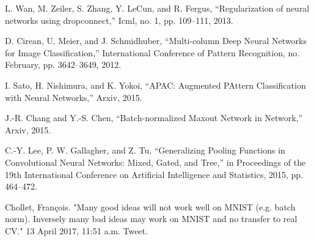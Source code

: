 \documentclass[twoside,twocolumn]{article}
\begin{document}
\begin{thebibliography}{99} %

L. Wan, M. Zeiler, S. Zhang, Y. LeCun, and R. Fergus, “Regularization of neural networks using dropconnect,” Icml, no. 1, pp. 109–111, 2013.

D. Cirean, U. Meier, and J. Schmidhuber, “Multi-column Deep Neural Networks for Image Classification,” International Conference of Pattern Recognition, no. February, pp. 3642–3649, 2012. 

I. Sato, H. Nishimura, and K. Yokoi, “APAC: Augmented PAttern Classification with Neural Networks,” Arxiv, 2015.

J.-R. Chang and Y.-S. Chen, “Batch-normalized Maxout Network in Network,” Arxiv, 2015.

C.-Y. Lee, P. W. Gallagher, and Z. Tu, “Generalizing Pooling Functions in Convolutional Neural Networks: Mixed, Gated, and Tree,” in Proceedings of the 19th International Conference on Artificial Intelligence and Statistics, 2015, pp. 464–472.

Chollet, François. "Many good ideas will not work well on MNIST (e.g. batch norm). Inversely many bad ideas may work on MNIST and no transfer to real CV." 13 April 2017, 11:51 a.m. Tweet.


\end{thebibliography}

\end{document}
